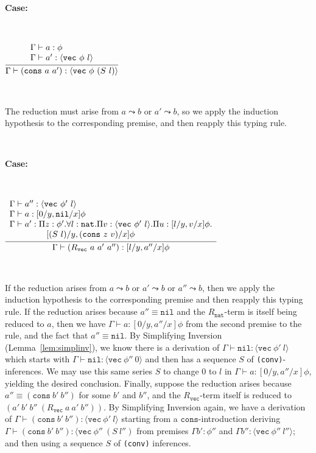 \documentclass[copyright]{eptcs}
\newcommand{\vc}[0]{\texttt{vec}}
\newcommand{\nat}[0]{\texttt{nat}}
\newcommand{\nil}[0]{\texttt{nil}}
\newcommand{\cons}[0]{\texttt{cons}}
\begin{document}
\ 

\noindent \textbf{Case:}

\

$\infer{\Gamma\vdash (\cons\ a\ a'):\langle \vc\ \phi\ (S\ l)\rangle}
      {\begin{array}{l}\Gamma\vdash a:\phi \\ \Gamma \vdash a':\langle \vc\ \phi\ l\rangle
       \end{array}}$

\ 

\noindent The reduction must arise from $a\leadsto b$ or $a'\leadsto
b$, so we apply the induction hypothesis to the corresponding premise,
and then reapply this typing rule.

\ 

\noindent \textbf{Case:}

\

$\infer{\Gamma\vdash (R_\vc\ a\ a'\ a''):[l/y, a''/x]\phi}
      {\begin{array}{l}\Gamma \vdash a'' : \langle \vc\ \phi'\ l\rangle \\
       \Gamma \vdash a : [0/y,\nil/x]\phi \\
       \Gamma \vdash a' : \Pi z:\phi'. \forall l:\nat. \Pi v :\langle \vc\ \phi'\ l\rangle. \Pi u : [l/y, v/x]\phi. \\
        \ \ \ \ \ \ \ \ \ \ \ \ \  [(S\ l)/y, (\cons\ z\ v)/x]\phi
       \end{array}}$

\ 

\noindent If the reduction arises from $a\leadsto b$ or $a'\leadsto b$
or $a''\leadsto b$, then we apply the induction hypothesis to the
corresponding premise and then reapply this typing rule.  If the
reduction arises because $a''\equiv\nil$ and the $R_\nat$-term is
itself being reduced to $a$, then we have $\Gamma\vdash
a:[0/y,a''/x]\phi$ from the second premise to the rule, and the fact
that $a''\equiv \nil$.  By Simplifying Inversion
(Lemma~\ref{lem:simplinv}), we know there is a derivation of
$\Gamma\vdash\nil:\langle\vc\ \phi'\ l\rangle$ which starts with
$\Gamma\vdash\nil:\langle\vc\ \phi''\ 0\rangle$ and then has a
sequence $S$ of \texttt{(conv)}-inferences.  We may use this same
series $S$ to change $0$ to $l$ in $\Gamma\vdash a:[0/y,a''/x]\phi$,
yielding the desired conclusion.  Finally, suppose the reduction
arises because $a''\equiv(\cons\ b'\ b'')$ for some $b'$ and $b''$,
and the $R_\vc$-term itself is reduced to
$(a'\ b'\ b''\ (R_\vc\ a\ a'\ b''))$.  By Simplifying Inversion again,
we have a derivation of $\Gamma \vdash
(\cons\ b'\ b''):\langle\vc\ \phi'\ l\rangle$ starting from a
$\cons$-introduction deriving $\Gamma\vdash
(\cons\ b'\ b''):\langle\vc\ \phi''\ (S\ l'')$ from premises $\Gamma
b':\phi''$ and $\Gamma b'':\langle\vc\ \phi''\ l''\rangle$; and then
using a sequence $S$ of \texttt{(conv)} inferences.
\end{document}
